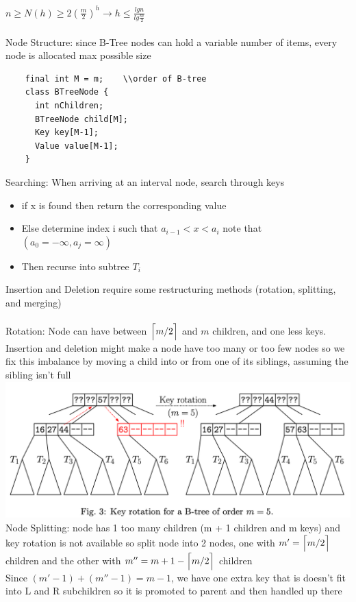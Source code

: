 \documentclass{article}
\DeclarePairedDelimiter{\ceil}{\lceil}{\rceil}
\begin{document}
  \indent $n \geq N(h) \geq 2(\frac{m}{2})^{h} \rightarrow h \leq \frac{lgn}{lg\frac{m}{2}}$\\ \\
  Node Structure: since B-Tree nodes can hold a variable number of items, every node is allocated max possible size
  \begin{lstlisting}
    final int M = m;    \\order of B-tree
    class BTreeNode {
      int nChildren;
      BTreeNode child[M];
      Key key[M-1];
      Value value[M-1]; 
    }
  \end{lstlisting}
  Searching: When arriving at an interval node, search through keys
  \begin{itemize}[noitemsep]
  \item if x is found then return the corresponding value
  \item Else determine index i such that $a_{i-1} < x < a_{i}$ note that $(a_{0} = -\infty, a_{j} = \infty)$
  \item Then recurse into subtree $T_{i}$\\
  \end{itemize}
  Insertion and Deletion require some restructuring methods (rotation, splitting, and merging)\\ \\
  Rotation: Node can have between $\ceil[\Big]{m/2}$ and $m$ children, and one less keys. Insertion and deletion might make a node have too many or too few nodes so we fix this imbalance by moving a child into or from one of its siblings, assuming the sibling isn't full\\
  \includegraphics[width=\textwidth]{BTreeRotations}
  Node Splitting: node has 1 too many children (m + 1 children and m keys) and key rotation is not available so split node into 2 nodes, one with $m' = \ceil[\Big]{m/2}$ children and the other with $m''= m + 1 - \ceil[\Big]{m/2}$ children\\
  Since $(m' - 1) + (m'' - 1) = m - 1$, we have one extra key that is doesn't fit into L and R subchildren so it is promoted to parent and then handled up there\\
\end{document}
